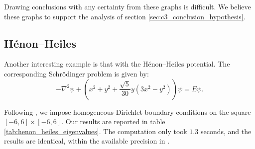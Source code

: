 Drawing conclusions with any certainty from these graphs is difficult. We believe these graphs to support the analysis of section \ref{sec:c3_conclusion_hypothesis}.

\subsection{Hénon--Heiles}\label{sec:c3_experiment_henon}

Another interesting example is that with the Hénon--Heiles potential. The corresponding Schrödinger problem is given by:
$$
  -\nabla^2 \psi + \left(x^2 + y^2 + \frac{\sqrt{5}}{30} y \left(3 x^2  - y^2\right)\right)\psi = E \psi \text{.}
$$

Following \cite{braun_efficient_1996}, we impose homogeneous Dirichlet boundary conditions on the square $[-6, 6] \times [-6, 6]$. Our results are reported in table \ref{tab:henon_heiles_eigenvalues}. The computation only took $1.3$ seconds, and the results are identical, within the available precision in \cite{braun_efficient_1996}.

